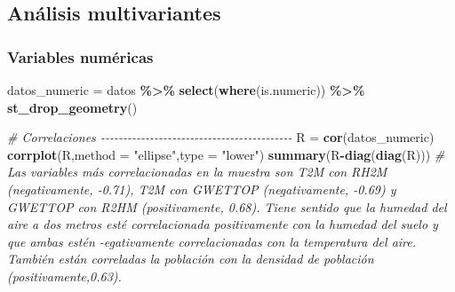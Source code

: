 \documentclass[12pt,a4paper,]{book}
\newenvironment{Shaded}{\begin{snugshade}}{\end{snugshade}}
\newcommand{\AttributeTok}[1]{\textcolor[rgb]{0.13,0.29,0.53}{#1}}
\newcommand{\CommentTok}[1]{\textcolor[rgb]{0.56,0.35,0.01}{\textit{#1}}}
\newcommand{\FunctionTok}[1]{\textcolor[rgb]{0.13,0.29,0.53}{\textbf{#1}}}
\newcommand{\NormalTok}[1]{#1}
\newcommand{\OtherTok}[1]{\textcolor[rgb]{0.56,0.35,0.01}{#1}}
\newcommand{\SpecialCharTok}[1]{\textcolor[rgb]{0.81,0.36,0.00}{\textbf{#1}}}
\newcommand{\StringTok}[1]{\textcolor[rgb]{0.31,0.60,0.02}{#1}}
\numberwithin{dummy}{section}
\theoremstyle{ocrenumbox}
\theoremstyle{blacknumex}
\theoremstyle{blacknumbox}
\theoremstyle{ocrenum}
\theoremstyle{ocrenum}
\begin{document}
\hypertarget{anuxe1lisis-multivariantes-1}{%
\subsection{Análisis
multivariantes}\label{anuxe1lisis-multivariantes-1}}

\hypertarget{variables-numuxe9ricas-1}{%
\subsubsection*{Variables numéricas}\label{variables-numuxe9ricas-1}}

\begin{Shaded}
\begin{Highlighting}[]
\NormalTok{datos\_numeric }\OtherTok{=}\NormalTok{ datos }\SpecialCharTok{\%\textgreater{}\%} 
  \FunctionTok{select}\NormalTok{(}\FunctionTok{where}\NormalTok{(is.numeric)) }\SpecialCharTok{\%\textgreater{}\%} 
  \FunctionTok{st\_drop\_geometry}\NormalTok{()}

\CommentTok{\# Correlaciones {-}{-}{-}{-}{-}{-}{-}{-}{-}{-}{-}{-}{-}{-}{-}{-}{-}{-}{-}{-}{-}{-}{-}{-}{-}{-}{-}{-}{-}{-}{-}{-}{-}{-}{-}{-}{-}{-}{-}{-}{-}{-}{-}}
\NormalTok{R }\OtherTok{=} \FunctionTok{cor}\NormalTok{(datos\_numeric)}
\FunctionTok{corrplot}\NormalTok{(R,}\AttributeTok{method =} \StringTok{"ellipse"}\NormalTok{,}\AttributeTok{type =} \StringTok{"lower"}\NormalTok{)}
\FunctionTok{summary}\NormalTok{(R}\SpecialCharTok{{-}}\FunctionTok{diag}\NormalTok{(}\FunctionTok{diag}\NormalTok{(R)))}
\CommentTok{\# Las variables más correlacionadas en la muestra son T2M con RH2M (negativamente, {-}0.71), T2M con GWETTOP (negativamente, {-}0.69) y GWETTOP con R2HM (positivamente, 0.68). Tiene sentido que la humedad del aire a dos metros esté correlacionada positivamente con la humedad del suelo y que ambas estén {-}egativamente correlacionadas con la temperatura del aire. También están correladas la población con la densidad de población (positivamente,0.63).}



\end{Highlighting}
\end{Shaded}
\end{document}
